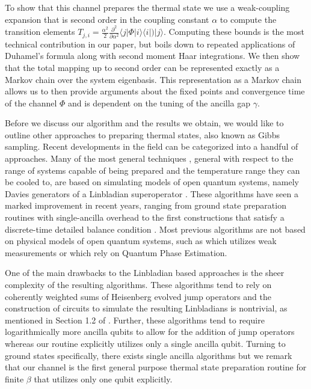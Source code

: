 \documentclass[11pt]{article}
\newcommand{\ket}[1]{|#1\rangle}
\newcommand{\bra}[1]{\langle #1|}
\newcommand{\ketbra}[2]{| #1\rangle\! \langle #2|}
\begin{document}
To show that this channel prepares the thermal state we use a weak-coupling expansion that is second order in the coupling constant $\alpha$ to compute the transition elements $T_{j, i} =  \frac{\alpha^2}{2} \frac{\partial^2}{\partial \alpha^2}\bra{j} \Phi\ketbra{i}{i}) \ket{j}$. Computing these bounds is the most technical contribution in our paper, but boils down to repeated applications of Duhamel's formula along with second moment Haar integrations. We then show that the total mapping up to second order can be represented exactly as a Markov chain over the system eigenbasis. This representation as a Markov chain allows us to then provide arguments about the fixed points and convergence time of the channel $\Phi$ and is dependent on the tuning of the ancilla gap $\gamma$.

Before we discuss our algorithm and the results we obtain, we would like to outline other approaches to preparing thermal states, also known as Gibbs sampling. Recent developments in the field \cite{chen2023quantumthermalstatepreparation, gilyen2024quantumgeneralizationsglaubermetropolis, motlagh2024ground, motta2019, ding2024single} can be categorized into a handful of approaches. Many of the most general techniques \cite{chen2023quantumthermalstatepreparation, gilyen2024quantumgeneralizationsglaubermetropolis}, general with respect to the range of systems capable of being prepared and the temperature range they can be cooled to, are based on simulating models of open quantum systems, namely Davies generators of a Linbladian superoperator \cite{davies1974markovian}. These algorithms have seen a marked improvement in recent years, ranging from ground state preparation routines with single-ancilla overhead \cite{ding2024single} to the first constructions that satisfy a discrete-time detailed balance condition \cite{gilyen2024quantumgeneralizationsglaubermetropolis}. Most previous algorithms are not based on physical models of open quantum systems, such as \cite{zhang2023dissipative} which utilizes weak measurements or \cite{poulin2009sampling, jiang2024quantummetropolissamplingweak} which rely on Quantum Phase Estimation.
  
One of the main drawbacks to the Linbladian based approaches is the sheer complexity of the resulting algorithms. These algorithms tend to rely on coherently weighted sums of Heisenberg evolved jump operators and the construction of circuits to simulate the resulting Linbladians is nontrivial, as mentioned in Section 1.2 of \cite{gilyen2024quantumgeneralizationsglaubermetropolis}. Further, these algorithms tend to require logarithmically more ancilla qubits to allow for the addition of jump operators whereas our routine explicitly utilizes only a single ancilla qubit. Turning to ground states specifically, there exists single ancilla algorithms \cite{ding2024single}  but we remark that our channel is the first general purpose thermal state preparation routine for finite $\beta$ that utilizes only one qubit explicitly. 
\end{document}
